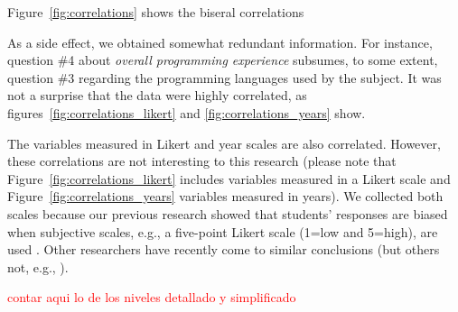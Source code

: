\documentclass[10pt,conference]{IEEEtran}\usepackage[]{graphicx}\usepackage[table,xcdraw]{xcolor}
\begin{document}
Figure~\ref{fig:correlations} shows the biseral correlations 

As a side effect, we obtained somewhat redundant information. For instance, question \#4 about \textit{overall programming experience} subsumes, to some extent, question \#3 regarding the programming languages used by the subject. It was not a surprise that the data were highly correlated, as figures~\ref{fig:correlations_likert} and \ref{fig:correlations_years} show. 

The variables measured in Likert and year scales are also correlated. However, these correlations are not interesting to this research (please note that Figure~\ref{fig:correlations_likert} includes variables measured in a Likert scale and Figure~\ref{fig:correlations_years} variables measured in years). We collected both scales because our previous research showed that students' responses are biased when subjective scales, e.g., a five-point Likert scale (1=low and 5=high), are used \cite{aranda2014evidence}. Other researchers have recently come to similar conclusions \cite{daun2021reliability} (but others not, e.g., \cite{siegmund2014measuring}).

\textcolor{red}{contar aqui lo de los niveles detallado y simplificado}

\FloatBarrier
\end{document}
